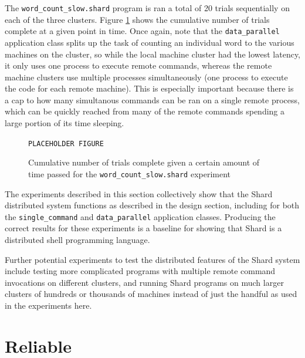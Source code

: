 \documentclass[twoside]{report}
\newcommand{\todoi}[1]{\todo[inline, color=blue!20]{TODO: {#1}}}
\begin{document}
The \texttt{word\_count\_slow.shard} program is ran a total of 20 trials sequentially on each of the three clusters. Figure \ref{fig:wordcountslow} shows the cumulative number of trials complete at a given point in time. Once again, note that the \texttt{data\_parallel} application class splits up the task of counting an individual word to the various machines on the cluster, so while the local machine cluster had the lowest latency, it only uses one process to execute remote commands, whereas the remote machine clusters use multiple processes simultaneously (one process to execute the code for each remote machine). This is especially important because there is a cap to how many simultanous commands can be ran on a single remote process, which can be quickly reached from many of the remote commands spending a large portion of its time sleeping.

\begin{figure}[h]
  \begin{center}
    \vspace{2cm}
    \texttt{PLACEHOLDER FIGURE}
    \vspace{2cm}
    \caption{Cumulative number of trials complete given a certain amount of time passed for the \texttt{word\_count\_slow.shard} experiment}
    \label{fig:wordcountslow}
  \end{center}
\end{figure}

\todoi{Some analysis on the actual results}

The experiments described in this section collectively show that the Shard distributed system functions as described in the design section, including for both the \texttt{single\_command} and \texttt{data\_parallel} application classes.
Producing the correct results for these experiments is a baseline for showing that Shard is a distributed shell programming language.

Further potential experiments to test the distributed features of the Shard system include testing more complicated programs with multiple remote command invocations on different clusters, and running Shard programs on much larger clusters of hundreds or thousands of machines instead of just the handful as used in the experiments here.

\section{Reliable}
\end{document}
